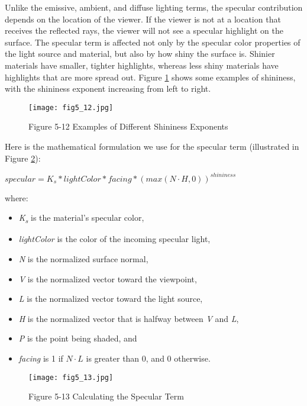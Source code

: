 \documentclass[../main.tex]{subfiles}
\begin{document}
Unlike the emissive, ambient, and diffuse lighting terms, the specular contribution depends on the location of the viewer. If the viewer is not at a location that receives the reflected rays, the viewer will not see a specular highlight on the surface. The specular term is affected not only by the specular color properties of the light source and material, but also by how shiny the surface is. Shinier materials have smaller, tighter highlights, whereas less shiny materials have highlights that are more spread out. Figure \ref{fig:5-12} shows some examples of shininess, with the shininess exponent increasing from left to right.

\begin{figure}
    \centering
    \texttt{[image: fig5\_12.jpg]}
    \caption{Figure 5-12 Examples of Different Shininess Exponents}
    \label{fig:5-12}
\end{figure}

Here is the mathematical formulation we use for the specular term (illustrated in Figure \ref{fig:5-13}):

$specular = K_s * lightColor * facing * (max(N \cdot H, 0)) ^{shininess}$

where:

\begin{itemize}
\item \textit{K\textsubscript{s}} is the material's specular color,
\item \textit{lightColor} is the color of the incoming specular light,
\item \textit{N} is the normalized surface normal,
\item \textit{V} is the normalized vector toward the viewpoint,
\item \textit{L} is the normalized vector toward the light source,
\item \textit{H} is the normalized vector that is halfway between \textit{V} and \textit{L},
\item \textit{P} is the point being shaded, and
\item \textit{facing} is 1 if $N \cdot L$ is greater than 0, and 0 otherwise.
\end{itemize}

\begin{figure}
    \centering
    \texttt{[image: fig5\_13.jpg]}
    \caption{Figure 5-13 Calculating the Specular Term}
    \label{fig:5-13}
\end{figure}
\end{document}

